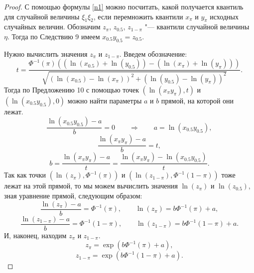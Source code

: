 \documentclass[specialist, substylefile = spbu.rtx,
subf,href,colorlinks=true, 12pt]{disser}
\begin{document}
	\begin{proof}
		С помощью формулы \eqref{n1} можно посчитать, какой получается квантиль для случайной величины $\xi_{1}\xi_{2}$, если перемножить квантили $x_{\pi}$ и $y_{\pi}$ исходных случайных величин. Обозначим $z_{\pi}$, $z_{0.5}$, $z_{1-\pi}$ "--- квантили случайной величины $\eta$. Тогда по Следствию 9 имеем $x_{0.5}y_{0.5} = z_{0.5}$.
		
		Нужно вычислить значения $z_{\pi}$ и $z_{1-\pi}$. Введем обозначение:
		\begin{equation*}
			t = \frac{\Phi^{-1}(\pi)((\ln(x_{0.5})+\ln(y_{0.5}))-(\ln(x_{\pi})+\ln(y_{\pi})))}{\sqrt{(\ln(x_{0.5})-\ln(x_{\pi}))^{2}+(\ln(y_{0.5})-\ln(y_{\pi}))^{2}}}. 
		\end{equation*}
		Тогда по Предложению 10 с помощью точек $(\ln(x_{\pi}y_{\pi}), t)$ и $(\ln(x_{0.5}y_{0.5}),0)$  можно найти параметры $a$ и $b$ прямой, на которой они лежат.
		\begin{equation*}
			\dfrac{\ln(x_{0.5}y_{0.5})-a}{b}=0 \quad\quad \Rightarrow \quad\quad a=\ln(x_{0.5}y_{0.5}),
		\end{equation*}
		\begin{equation*}
			\dfrac{\ln(x_{\pi}y_{\pi})-a}{b}=t,
		\end{equation*}
		\begin{equation*}
			b=\dfrac{\ln(x_{\pi}y_{\pi})-a}{t}=\dfrac{\ln(x_{\pi}y_{\pi})-\ln(x_{0.5}y_{0.5})}{t}.
		\end{equation*}
		Так как точки $(\ln(z_{\pi}), \Phi^{-1}(\pi))$ и $(\ln(z_{1-\pi}), \Phi^{-1}(1-\pi))$ тоже лежат на этой прямой, то мы можем вычислить значения $\ln(z_{\pi})$ и $\ln(z_{0.5})$, зная уравнение прямой, следующим образом:
		\begin{equation*}
			\dfrac{\ln(z_{\pi})-a}{b}=\Phi^{-1}(\pi), \quad\quad \ln(z_{\pi})=b\Phi^{-1}(\pi)+a,
		\end{equation*}
		\begin{equation*}
			\dfrac{\ln(z_{1-\pi})-a}{b}=\Phi^{-1}(1-\pi), \quad\quad \ln(z_{1-\pi})=b\Phi^{-1}(1-\pi)+a.
		\end{equation*}
		И, наконец, находим $z_{\pi}$ и $z_{1-\pi}$.
		\begin{equation*}
			z_{\pi}=\exp(b\Phi^{-1}(\pi)+a),
		\end{equation*}
		\begin{equation*}
			z_{1-\pi}=\exp(b\Phi^{-1}(1-\pi)+a).
		\end{equation*}
	\end{proof}
	
\end{document}
